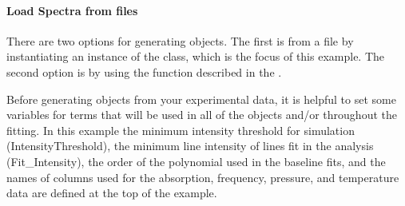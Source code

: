 \documentclass[letterpaper,10pt,english]{sphinxmanual}
\begin{document}
\paragraph{Load Spectra from files}
\label{\detokenize{Fitting Experimental Spectra:load-spectra-from-files}}
\sphinxAtStartPar
There are two options for generating {\hyperref[\detokenize{MATS:MATS.spectrum.Spectrum}]{}} objects.  The first is from a file by instantiating an instance of the class, which is the focus of this example.  The second option is by using the {\hyperref[\detokenize{MATS:MATS.spectrum.simulate_spectrum}]{}} function described in the .

\sphinxAtStartPar
Before generating {\hyperref[\detokenize{MATS:MATS.spectrum.Spectrum}]{}} objects from your experimental data, it is helpful to set some variables for terms that will be used in all of the {\hyperref[\detokenize{MATS:MATS.spectrum.Spectrum}]{}} objects and/or throughout the fitting.  In this example the minimum intensity threshold for simulation (IntensityThreshold), the minimum line intensity of lines  fit in the analysis (Fit\_Intensity), the order of the polynomial used in the baseline fits, and the names of columns used for the absorption, frequency, pressure, and temperature data are defined at the top of the example.

\begin{sphinxVerbatim}[commandchars=\\\{\}]
   
   
   
  
   
   
  
  
\end{sphinxVerbatim}
\end{document}
